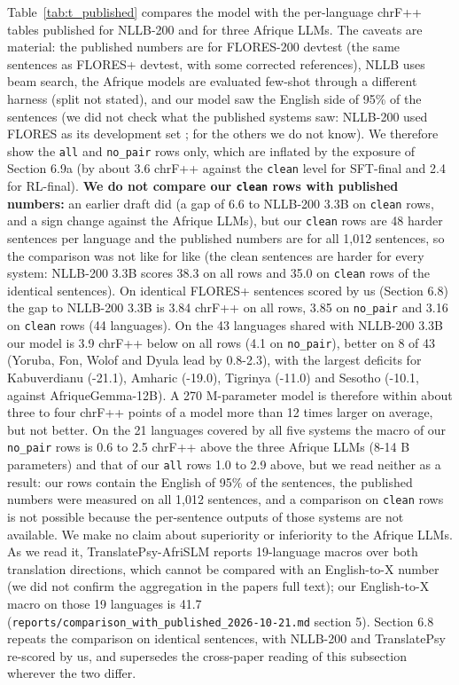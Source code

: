 Table~\ref{tab:t_published} compares the model with the per-language chrF++ tables published for NLLB-200 and for three Afrique LLMs. The caveats are material: the published numbers are for FLORES-200 devtest (the same sentences as FLORES+ devtest, with some corrected references), NLLB uses beam search, the Afrique models are evaluated few-shot through a different harness (split not stated), and our model saw the English side of 95\% of the sentences (we did not check what the published systems saw: NLLB-200 used FLORES as its development set \citep{nllb2022nllb}; for the others we do not know). We therefore show the \texttt{all} and \texttt{no\_pair} rows only, which are inflated by the exposure of Section 6.9a (by about 3.6 chrF++ against the \texttt{clean} level for SFT-final and 2.4 for RL-final). \textbf{We do not compare our \texttt{clean} rows with published numbers:} an earlier draft did (a gap of 6.6 to NLLB-200 3.3B on \texttt{clean} rows, and a sign change against the Afrique LLMs), but our \texttt{clean} rows are 48 harder sentences per language and the published numbers are for all 1,012 sentences, so the comparison was not like for like (the clean sentences are harder for every system: NLLB-200 3.3B scores 38.3 on all rows and 35.0 on \texttt{clean} rows of the identical sentences). On identical FLORES+ sentences scored by us (Section 6.8) the gap to NLLB-200 3.3B is 3.84 chrF++ on all rows, 3.85 on \texttt{no\_pair} and 3.16 on \texttt{clean} rows (44 languages). On the 43 languages shared with NLLB-200 3.3B our model is 3.9 chrF++ below on all rows (4.1 on \texttt{no\_pair}), better on 8 of 43 (Yoruba, Fon, Wolof and Dyula lead by 0.8-2.3), with the largest deficits for Kabuverdianu (-21.1), Amharic (-19.0), Tigrinya (-11.0) and Sesotho (-10.1, against AfriqueGemma-12B). A 270 M-parameter model is therefore within about three to four chrF++ points of a model more than 12 times larger on average, but not better. On the 21 languages covered by all five systems the macro of our \texttt{no\_pair} rows is 0.6 to 2.5 chrF++ above the three Afrique LLMs (8-14 B parameters) and that of our \texttt{all} rows 1.0 to 2.9 above, but we read neither as a result: our rows contain the English of 95\% of the sentences, the published numbers were measured on all 1,012 sentences, and a comparison on \texttt{clean} rows is not possible because the per-sentence outputs of those systems are not available. We make no claim about superiority or inferiority to the Afrique LLMs. As we read it, TranslatePsy-AfriSLM reports 19-language macros over both translation directions, which cannot be compared with an English-to-X number \citep{gritta2026translatepsy} (we did not confirm the aggregation in the paper\textquotesingle s full text); our English-to-X macro on those 19 languages is 41.7 (\texttt{reports/comparison\_with\_published\_2026-10-21.md} section 5). Section 6.8 repeats the comparison on identical sentences, with NLLB-200 and TranslatePsy re-scored by us, and supersedes the cross-paper reading of this subsection wherever the two differ.

